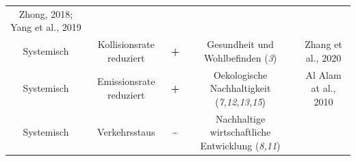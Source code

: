 \documentclass[
]{book}
\begin{document}
\begin{longtable}[]{@{}ccccc@{}}
\begin{minipage}[t]{0.17\columnwidth}
Zhong, 2018; Yang et al., 2019\strut
\end{minipage}\tabularnewline
\begin{minipage}[t]{0.17\columnwidth}\centering
Systemisch\strut
\end{minipage} & \begin{minipage}[t]{0.16\columnwidth}\centering
Kollisionsrate reduziert\strut
\end{minipage} & \begin{minipage}[t]{0.17\columnwidth}\centering
\textbf{+}\strut
\end{minipage} & \begin{minipage}[t]{0.17\columnwidth}\centering
Gesundheit und Wohlbefinden (\emph{3})\strut
\end{minipage} & \begin{minipage}[t]{0.17\columnwidth}\centering
Zhang et al., 2020\strut
\end{minipage}\tabularnewline
\begin{minipage}[t]{0.17\columnwidth}\centering
Systemisch\strut
\end{minipage} & \begin{minipage}[t]{0.16\columnwidth}\centering
Emissionsrate reduziert\strut
\end{minipage} & \begin{minipage}[t]{0.17\columnwidth}\centering
\textbf{+}\strut
\end{minipage} & \begin{minipage}[t]{0.17\columnwidth}\centering
Oekologische Nachhaltigkeit (\emph{7,12,13,15})\strut
\end{minipage} & \begin{minipage}[t]{0.17\columnwidth}\centering
Al Alam at al., 2010\strut
\end{minipage}\tabularnewline
\begin{minipage}[t]{0.17\columnwidth}\centering
Systemisch\strut
\end{minipage} & \begin{minipage}[t]{0.16\columnwidth}\centering
Verkehrsstaus\strut
\end{minipage} & \begin{minipage}[t]{0.17\columnwidth}\centering
\textbf{\textasciitilde{}}\strut
\end{minipage} & \begin{minipage}[t]{0.17\columnwidth}\centering
Nachhaltige wirtschaftliche Entwicklung (\emph{8,11})\strut
\end{minipage} & \begin{minipage}[t]{0.17\columnwidth}\centering

\end{minipage}
\end{longtable}
\end{document}
